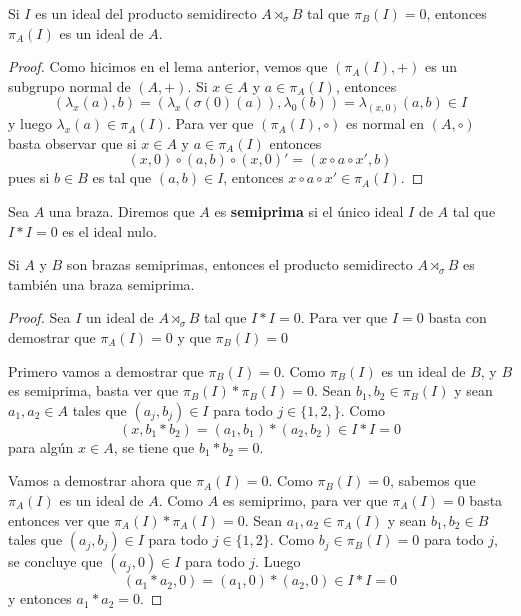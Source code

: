 \begin{lemma}
Si $I$ es un ideal del producto semidirecto $A\rtimes_{\sigma}B$ tal que 
$\pi_B(I)=0$, entonces $\pi_A(I)$ es un ideal de $A$.
\end{lemma}

\begin{proof}
    Como hicimos en el lema anterior, vemos que $(\pi_A(I),+)$ es un subgrupo normal de $(A,+)$. Si $x\in A$ y $a\in \pi_A(I)$, entonces
    \[
    (\lambda_x(a),b)=(\lambda_x(\sigma(0)(a)),\lambda_0(b))=\lambda_{(x,0)}(a,b)\in I
    \]
    y luego $\lambda_x(a)\in\pi_A(I)$. Para ver que $(\pi_A(I),\circ)$ es normal en $(A,\circ)$ basta
    observar que si $x\in A$ y $a\in\pi_A(I)$ entonces
    \[
    (x,0)\circ(a,b)\circ(x,0)'=(x\circ a\circ x',b)
    \]
    pues si $b\in B$ es tal que $(a,b)\in I$, entonces $x\circ a\circ x'\in \pi_A(I)$.
\end{proof}

\begin{definition}
    Sea $A$ una braza. Diremos que $A$ es \textbf{semiprima} si el único ideal $I$ de $A$ 
    tal que $I*I=0$ es el ideal nulo.
\end{definition}

\begin{theorem}
\label{thm:sd_semiprime}
Si $A$ y $B$ son brazas semiprimas, entonces el producto semidirecto
$A\rtimes_{\sigma}B$ es también una braza semiprima.
\end{theorem}

\begin{proof}
    Sea $I$ un ideal de $A\rtimes_\sigma B$ tal que $I*I=0$. Para ver que $I=0$ basta
    con demostrar que $\pi_A(I)=0$ y que $\pi_B(I)=0$

    Primero vamos a demostrar que $\pi_B(I)=0$. Como $\pi_B(I)$ es un ideal de $B$, 
    y $B$ es semiprima, basta ver que $\pi_B(I)*\pi_B(I)=0$. Sean $b_1,b_2\in \pi_B(I)$ y sean 
    $a_1,a_2\in A$ tales que $(a_j,b_j)\in I$ para todo $j\in\{1,2,\}$. Como 
    \[
    (x,b_1*b_2)=(a_1,b_1)*(a_2,b_2)\in I*I=0
    \]
    para algún $x\in A$, se tiene que $b_1*b_2=0$.
    
    Vamos a demostrar ahora que $\pi_A(I)=0$. 
    Como $\pi_B(I)=0$, sabemos que $\pi_A(I)$ es un ideal de $A$. Como $A$ es semiprimo, para ver que $\pi_A(I)=0$ basta entonces ver que $\pi_A(I)*\pi_A(I)=0$. Sean $a_1,a_2\in \pi_A(I)$ y sean
    $b_1,b_2\in B$ tales que $(a_j,b_j)\in I$ para todo $j\in\{1,2\}$. Como $b_j\in \pi_B(I)=0$ para todo $j$, se concluye que $(a_j,0)\in I$ para todo $j$. Luego
    \[
    (a_1*a_2,0)=(a_1,0)*(a_2,0)\in I*I=0
    \]
    y entonces $a_1*a_2=0$. 
\end{proof}

